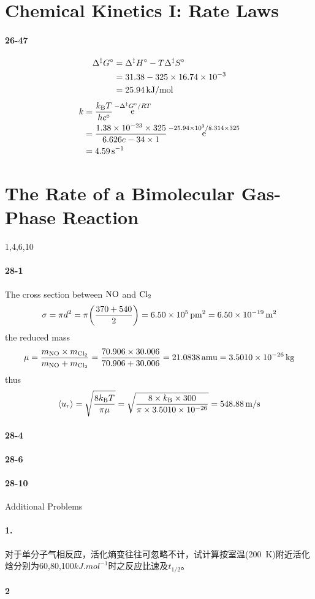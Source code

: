\documentclass[a4paper]{article}
\DeclareMathOperator{\e}{\mathrm{e}}
\newcommand{\kB}{k_\mathrm{B}}
\newcommand{\ex}[1]{\paragraph{#1}}
\numberwithin{equation}{section}
\begin{document}
\section{Chemical Kinetics I: Rate Laws}
\ex{26-47}
\begin{align}
\Delta^\ddagger G^\circ &= \Delta^\ddagger H^\circ - T\Delta^\ddagger S^\circ \notag\\
&= 31.38 - 325\times \num{16.74e-3} \notag\\
&= \SI{25.94}{kJ/mol}
\end{align}
\begin{align}
k &= \dfrac{\kB T}{h c^\circ}\e^{-\Delta^\ddagger G^\circ/RT} \notag\\
&= \dfrac{\num{1.38e-23}\times 325}{6.626e-34\times 1} \e^{\num{-25.94e3}/8.314\times 325} \notag\\
&= \SI{4.59}{s^{-1}}
\end{align}


\setcounter{section}{27}
\section{The Rate of a Bimolecular Gas-Phase Reaction}
1,4,6,10\\
\ex{28-1}
The cross section between $ \ce{NO} $ and $ \ce{Cl_2} $
\begin{equation}\label{key}
\sigma = \pi d^2 = \pi \qty(\dfrac{370 + 540}{2}) = \SI{6.50e5}{pm^2} = \SI{6.50e-19}{m^2}
\end{equation}
the reduced mass
\begin{equation}\label{key}
\mu = \dfrac{m_{\ce{NO}}\times m_{\ce{Cl_2}}}{m_{\ce{NO}} + m_{\ce{Cl_2}}} = \dfrac{70.906\times 30.006}{70.906 + 30.006} = \SI{21.0838}{amu} = \SI{3.5010e-26}{kg}
\end{equation}
thus 
\begin{equation}\label{key}
\ev{u_r} = \sqrt{\dfrac{8\kB T}{\pi \mu}} = \sqrt{\dfrac{8\times \kB\times 300}{\pi\times \num{3.5010e-26}}} = \SI{548.88}{m/s}
\end{equation}


\ex{28-4}


\ex{28-6}



\ex{28-10}



Additional Problems\\
\ex{1.} 对于单分子气相反应，活化熵变往往可忽略不计，试计算按室温(\SI{200}{K})附近活化焓分别为60,80,100$ \si{kJ.mol^{-1}} $时之反应比速及$ t_{1/2} $。


\ex{2}
\end{document}

